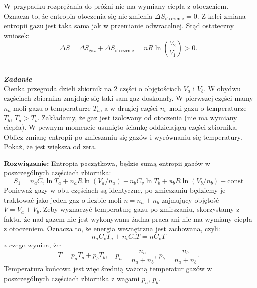 \documentclass[11pt,a4paper]{article}
\renewcommand{\t}[1]{\textrm{#1}}
\newcounter{zadanie}\newcommand{\zadanie}[1][]{\addtocounter{zadanie}{1} ~\\  {\bf \emph{Zadanie \arabic{zadanie} #1 }} \\}
\renewcommand{\t}[1]{\textrm{#1}}
\begin{document}
W przypadku rozprężania do próżni nie ma wymiany ciepła z otoczeniem. Oznacza to, że entropia otoczenia się nie zmienia $\Delta S_{\textrm{otoczenie}} = 0$. Z kolei zmiana entropii gazu jest taka sama jak w przemianie odwracalnej. Stąd ostateczny wniosek:
\begin{equation}
 \Delta S = \Delta S_{\textrm{gaz}} +  \Delta S_{\textrm{otoczenie}} = n R \ln \left(\frac{V_2}{V_1} \right) > 0.
\end{equation}

\newpage

\zadanie
Cienka przegroda dzieli zbiornik na 2 części o objętościach $V_a$ i $V_b$.
W obydwu częściach zbiornika znajduje się taki sam gaz doskonały.
W pierwszej części mamy $n_a$ moli gazu o temperaturze $T_a$, a w drugiej części $n_b$ moli
gazu o temperaturze $T_b$, $T_a >  T_b$.
Zakładamy, że gaz jest izolowany od otoczenia (nie ma wymiany ciepła).
W pewnym momencie usunięto ściankę oddzielającą części zbiornika.
Oblicz zmianę entropii po zmieszaniu się
gazów i wyrównaniu się temperatury. Pokaż, że jest większa od zera.

\vskip 10pt
\noindent
\textbf{Rozwiązanie:}
Entropia początkowa, będzie sumą entropii gazów w poszczególnych częściach zbiornika:
\begin{equation}
S_1 = n_a C_v \ln T_a  + n_a R \ln (V_a/n_a)   +  n_b C_v \ln T_b  + n_b R \ln (V_b/n_b)  + \t{const}
\end{equation}
Ponieważ gazy w obu częściach są identyczne, po zmieszaniu będziemy je traktować jako jeden gaz
o liczbie moli $n =n_a + n_b$ zajmujący objętość $V=V_a + V_b$. Żeby wyznaczyć temperaturę gazu po zmieszaniu, skorzystamy z faktu, że nad gazem nie jest wykonywana żadna praca ani nie ma wymiany ciepła z otoczeniem. Oznacza to, że energia wewnętrzna jest zachowana, czyli:
\begin{equation}
  n_a C_v T_a + n_b C_v T = n C_v T
\end{equation}
z czego wynika, że:
\begin{equation}
  T = p_a T_a + p_b T_b, \quad p_a = \frac{n_a}{n_a+n_b},\  p_b = \frac{n_b}{n_a + n_b}.
\end{equation}
Temperatura końcowa jest więc średnią ważoną temperatur gazów w poszczególnych częściach zbiornika z wagami $p_a$, $p_b$.
\end{document}
